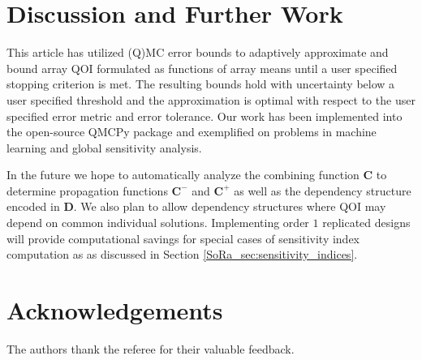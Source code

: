 \documentclass[graybox]{svmult}
\begin{document}
\section{Discussion and Further Work} \label{SoRa_sec:conclusions}

This article has utilized (Q)MC error bounds to adaptively approximate and bound array QOI formulated as functions of array means until a user specified stopping criterion is met. The resulting bounds hold with uncertainty below a user specified threshold and the approximation is optimal with respect to the user specified error metric and error tolerance. Our work has been implemented into the open-source QMCPy package and exemplified on problems in machine learning and global sensitivity analysis. 

In the future we hope to automatically analyze the combining function $\boldsymbol{C}$ to determine propagation functions $\boldsymbol{C}^-$ and $\boldsymbol{C}^+$ as well as the dependency structure encoded in $\boldsymbol{D}$. We also plan to allow dependency structures where QOI may depend on common individual solutions. Implementing order $1$ replicated designs will provide computational savings for special cases of sensitivity index computation as as discussed in Section \ref{SoRa_sec:sensitivity_indices}. 

\section*{Acknowledgements}

The authors thank the referee for their valuable feedback.

%
%
%
\end{document}
